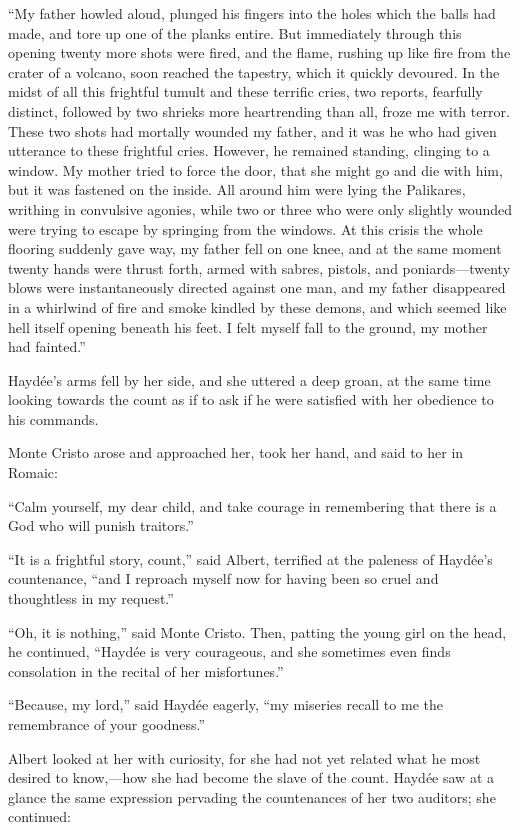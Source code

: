 “My father howled aloud, plunged his fingers into the holes which the
balls had made, and tore up one of the planks entire. But immediately
through this opening twenty more shots were fired, and the flame,
rushing up like fire from the crater of a volcano, soon reached the
tapestry, which it quickly devoured. In the midst of all this frightful
tumult and these terrific cries, two reports, fearfully distinct,
followed by two shrieks more heartrending than all, froze me with
terror. These two shots had mortally wounded my father, and it was he
who had given utterance to these frightful cries. However, he remained
standing, clinging to a window. My mother tried to force the door, that
she might go and die with him, but it was fastened on the inside. All
around him were lying the Palikares, writhing in convulsive agonies,
while two or three who were only slightly wounded were trying to escape
by springing from the windows. At this crisis the whole flooring
suddenly gave way, my father fell on one knee, and at the same moment
twenty hands were thrust forth, armed with sabres, pistols, and
poniards—twenty blows were instantaneously directed against one man,
and my father disappeared in a whirlwind of fire and smoke kindled by
these demons, and which seemed like hell itself opening beneath his
feet. I felt myself fall to the ground, my mother had fainted.”

Haydée’s arms fell by her side, and she uttered a deep groan, at the
same time looking towards the count as if to ask if he were satisfied
with her obedience to his commands.

Monte Cristo arose and approached her, took her hand, and said to her
in Romaic:

“Calm yourself, my dear child, and take courage in remembering that
there is a God who will punish traitors.”

“It is a frightful story, count,” said Albert, terrified at the
paleness of Haydée’s countenance, “and I reproach myself now for having
been so cruel and thoughtless in my request.”

“Oh, it is nothing,” said Monte Cristo. Then, patting the young girl on
the head, he continued, “Haydée is very courageous, and she sometimes
even finds consolation in the recital of her misfortunes.”

“Because, my lord,” said Haydée eagerly, “my miseries recall to me the
remembrance of your goodness.”

Albert looked at her with curiosity, for she had not yet related what
he most desired to know,—how she had become the slave of the count.
Haydée saw at a glance the same expression pervading the countenances
of her two auditors; she continued:

